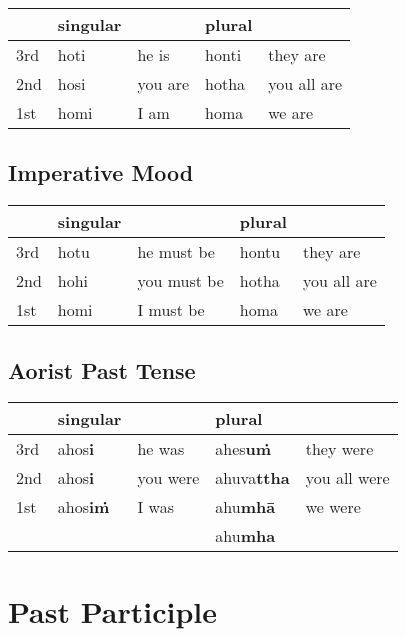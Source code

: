 \documentclass[11pt,oneside]{memoir}
\begin{document}
\begin{center}
\begin{tabular}{lllll}
 & singular &  & plural & \\[0pt]
\hline
3rd & hoti & he is & honti & they are\\[0pt]
2nd & hosi & you are & hotha & you all are\\[0pt]
1st & homi & I am & homa & we are\\[0pt]
\end{tabular}
\end{center}

\subsection{Imperative Mood}
\label{sec:org2fcff11}

\begin{center}
\begin{tabular}{lllll}
 & singular &  & plural & \\[0pt]
\hline
3rd & hotu & he must be & hontu & they are\\[0pt]
2nd & hohi & you must be & hotha & you all are\\[0pt]
1st & homi & I must be & homa & we are\\[0pt]
\end{tabular}
\end{center}

\subsection{Aorist Past Tense}
\label{sec:orga5c966a}

\begin{center}
\begin{tabular}{lllll}
 & singular &  & plural & \\[0pt]
\hline
3rd & ahos\textbf{i} & he was & ahes\textbf{uṁ} & they were\\[0pt]
2nd & ahos\textbf{i} & you were & ahuva\textbf{ttha} & you all were\\[0pt]
1st & ahos\textbf{iṁ} & I was & ahu\textbf{mhā} & we were\\[0pt]
 &  &  & ahu\textbf{mha} & \\[0pt]
\end{tabular}
\end{center}

\clearpage

\section{Past Participle}
\label{sec:orgad98335}
\end{document}
